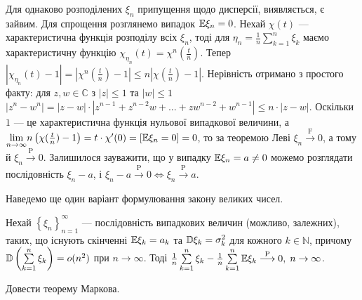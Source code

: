 \begin{remark}
    Для однаково розподілених $\xi_n$ припущення щодо дисперсії, виявляється, є зайвим. Для спрощення розглянемо випадок $\mathbb{E}\xi_n = 0$.
    Нехай $\chi(t)$ --- характеристична функція розподілу всіх $\xi_n$, тоді для $\eta_n = \frac{1}{n}\sum\limits_{k=1}^n \xi_k$ 
    маємо характеристичну функцію $\chi_{\eta_n} (t) = \chi^n \left(\frac{t}{n}\right)$. 
    Тепер $\left| \chi_{\eta_n} (t) - 1\right| = \left| \chi^n \left(\frac{t}{n}\right) - 1\right| \leq n \left| \chi \left(\frac{t}{n}\right) - 1\right|$.
    Нерівність отримано з простого факту: для $z, w \in \mathbb{C}$ з $|z| \leq 1$ та $|w|\leq 1$
    $\left|z^n - w^n\right| = \left|z - w\right| \cdot \left|z^{n-1} + z^{n-2}w + ... + z w^{n-2} + w^{n-1}\right| \leq n \cdot \left|z - w\right|$.
    Оскільки $1$ --- це характеристична функція нульової випадкової величини, а \\
    \noindent$ \underset{n \to \infty}{\lim} n \left(\chi(\frac{t}{n}) - 1\right) = t \cdot \chi'(0) = \left[ \mathbb{E}\xi_n = 0\right]=0$,
    то за теоремою Леві $\xi_n \overset{\mathrm{F}}{\longrightarrow} 0$, а тому й $\xi_n \overset{\mathrm{P}}{\longrightarrow} 0$. Залишилося зауважити, що у випадку
    $\mathbb{E}\xi_n = a \neq 0$ можемо розглядати послідовність $\xi_n - a$, і $\xi_n - a \overset{\mathrm{P}}{\longrightarrow} 0 \Leftrightarrow \xi_n \overset{\mathrm{P}}{\longrightarrow} a$. 
\end{remark}
Наведемо ще один варіант формулювання закону великих чисел.
\begin{theorem*}
    Нехай $\left\{ \xi_n\right\}_{n=1}^{\infty}$ --- послідовність випадкових величин (можливо, залежних), 
    таких, що існують скінченні $\mathbb{E}\xi_k = a_k$ та $\mathbb{D}\xi_k = \sigma_k^2$ для кожного $k \in \mathbb{N}$,
    причому $\mathbb{D} \left( \sum\limits_{k=1}^n \xi_k\right) = o(n^2)$ при $n\to\infty$.
    Тоді
    $
        \frac{1}{n}\sum\limits_{k=1}^n \xi_k - \frac{1}{n}\sum\limits_{k=1}^n \mathbb{E}\xi_k \overset{\mathrm{P}}{\longrightarrow} 0, \; n \to \infty
    $.
\end{theorem*}
\begin{exercise}
    Довести теорему Маркова.
\end{exercise}
